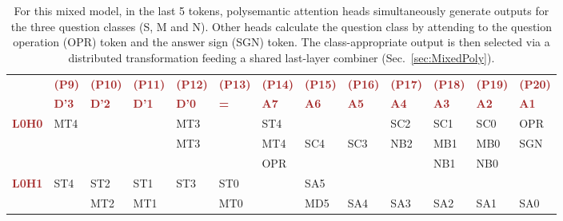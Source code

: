 \documentclass[11pt]{article}
\begin{document}
\begin{table}[h]
    \caption{For this mixed model, in the last 5 tokens, polysemantic attention heads simultaneously generate outputs for the three question classes (S, M and N). Other heads calculate the question class by attending to the question operation (OPR) token and the answer sign (SGN) token. The class-appropriate output is then selected via a distributed transformation feeding a shared last-layer combiner (Sec.~\ref{sec:MixedPoly}).}
    \label{tab:MathsPurposePerNodeMix6D}
    \vspace{0.1in}
    \sffamily
    \small
    \centering
    \renewcommand{\arraystretch}{1.3}

    \begin{tabularx}{\textwidth}{|c|*{12}{>{\centering\arraybackslash}X|}}

    \hline
    & \textcolor{brown}{\textbf{(P9)}} & \textcolor{brown}{\textbf{(P10)}} & \textcolor{brown}{\textbf{(P11)}} & \textcolor{brown}{\textbf{(P12)}} & \textcolor{brown}{\textbf{(P13)}} & \textcolor{brown}{\textbf{(P14)}} & \textcolor{brown}{\textbf{(P15)}} & \textcolor{brown}{\textbf{(P16)}} & \textcolor{brown}{\textbf{(P17)}} & \textcolor{brown}{\textbf{(P18)}} & \textcolor{brown}{\textbf{(P19)}} & \textcolor{brown}{\textbf{(P20)}} \\
    & \textcolor{brown}{\textbf{D'3}} & \textcolor{brown}{\textbf{D'2}} & \textcolor{brown}{\textbf{D'1}} & \textcolor{brown}{\textbf{D'0}} & \textcolor{brown}{\textbf{=}} & \textcolor{brown}{\textbf{A7}} & \textcolor{brown}{\textbf{A6}} & \textcolor{brown}{\textbf{A5}} & \textcolor{brown}{\textbf{A4}} & \textcolor{brown}{\textbf{A3}} & \textcolor{brown}{\textbf{A2}} & \textcolor{brown}{\textbf{A1}} \\
    \hline
    \multirow{3}{*}{\textcolor{brown}{\textbf{L0H0}}} & MT4 & \cellcolor{black!80} & \cellcolor{black!80}  & MT3 & \cellcolor{black!80}  & ST4 &  &  & SC2 & SC1 & SC0 & OPR \\
    & & \cellcolor{black!80} &  \cellcolor{black!80} & MT3 &  \cellcolor{black!80} & MT4 & SC4 & SC3 & NB2 & MB1 & MB0 & SGN\\
    & & \cellcolor{black!80} & \cellcolor{black!80} & & \cellcolor{black!80} & OPR & &  &  & NB1 & NB0 & \\ \cline{1-8}
    \hline

    \multirow{2}{*}{\textcolor{brown}{\textbf{L0H1}}} & ST4 & ST2 & ST1 & ST3 & ST0 & \cellcolor{black!80} & SA5 &  &  &  &  & \\
    & & MT2 & MT1 & & MT0 & \cellcolor{black!80} & MD5 & SA4 & SA3 & SA2 & SA1 & SA0\\ \cline{1-2}


\end{tabularx}
\end{table}
\end{document}

